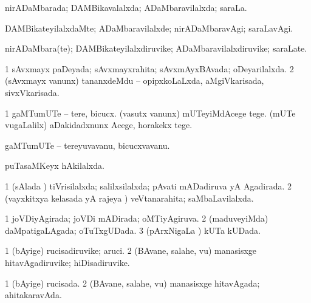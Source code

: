 \bentry
{} 
\gl{\nA}
\expl{}
\bmng
nirADaMbarada; DAMBikavalalxda; ADaMbaravilalxda; saraLa. 
\emng
\eentry

\bentry
{} 
\gl{\kirxvi}
\expl{}
\bmng
DAMBikateyilalxdaMte; ADaMbaravilalxde; nirADaMbaravAgi; saraLavAgi. 
\emng
\eentry

\bentry
{} 
\gl{\nA}
\expl{}
\bmng
nirADaMbara(te); DAMBikateyilalxdiruvike; ADaMbaravilalxdiruvike; saraLate. 
\emng
\eentry

\bentry
{} 
\gl{\gu}
\bmng
\bnum
\num{1} sAvxmayx paDeyada; sAvxmayxrahita; sAvxmAyxBAvada; oDeyarilalxda. 
\num{2} (sAvxmayx \mo vanunx) tananxdeMdu -- opipxkoLaLxda, aMgiVkarisada, sivxVkarisada. 
\enum
\emng
\eentry

\bentry
{} 
\gl{\sakirx}
\expl{}
\bmng
\bnum
\num{1} gaMTumUTe -- tere, bicucx. 
\banum
{} (vasutx \mo vanunx) mUTeyiMdAcege tege. 
 (mUTe \mo vugaLalilx) aDakidadxnunx Acege, horakekx tege. 
\eanum
\numie
\enum
\emng
\eentry

\bentry
{} 
\gl{\nA}
\expl{}
\bmng
gaMTumUTe -- tereyuvavanu, bicucxvavanu. 
\emng
\eentry

\bentry
{} 
\gl{\gu}
\bmng
puTasaMKeyx hAkilalxda. 
\emng
\eentry

\bentry
{} 
\gl{\gu}
\bmng
\bnum
\num{1} (sAlada \vi) tiVrisilalxda; salilxsilalxda; pAvati mADadiruva yA Agadirada. 
\num{2} (vayxkitxya kelasada yA rajeya \vi) veVtanarahita; saMbaLavilalxda. 
\enum
\emng
\eentry

\bentry
{} 
\gl{\gu}
\expl{}
\bmng
\bnum
\num{1} joVDiyAgirada; joVDi mADirada; oMTiyAgiruva. 
\num{2} (maduveyiMda) daMpatigaLAgada; oTuTxgUDada. 
\num{3} (pArxNigaLa \vi) kUTa kUDada. 
\enum
\emng
\eentry

\bentry
{} 
\gl{\nA}
\expl{}
\bmng
\bnum
\num{1} (bAyige) rucisadiruvike; aruci. 
\num{2} (BAvane, salahe, \mo vu) manasisxge hitavAgadiruvike; hiDisadiruvike. 
\enum
\emng
\eentry

\bentry
{} 
\gl{\gu}
\expl{}
\bmng
\bnum
\num{1} (bAyige) rucisada. 
\num{2} (BAvane, salahe, \mo vu) manasisxge hitavAgada; ahitakaravAda. 
\enum
\emng
\eentry

